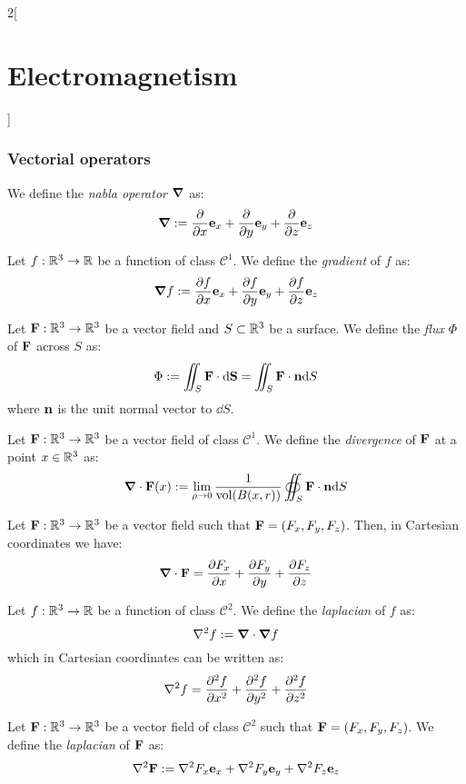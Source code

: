 \documentclass[../../../main.tex]{subfiles}
\begin{document}
\begin{multicols}{2}[\section{Electromagnetism}]
  \subsubsection{Vectorial operators}
  \begin{definition}
    We define the \emph{nabla operator} $\grad$ as: $$\grad:=\pdv{}{x}\boldsymbol{\mathrm{e}}_x+\pdv{}{y}\boldsymbol{\mathrm{e}}_y+\pdv{}{z}\boldsymbol{\mathrm{e}}_z$$
  \end{definition}
  \begin{definition}[Gradient]
    Let $f:\mathbb{R}^3\rightarrow\mathbb{R}$ be a function of class $\mathcal{C}^1$. We define the \emph{gradient} of $f$ as: $$\grad f:=\pdv{f}{x}\boldsymbol{\mathrm{e}}_x+\pdv{f}{y}\boldsymbol{\mathrm{e}}_y+\pdv{f}{z}\boldsymbol{\mathrm{e}}_z$$
  \end{definition}
  \begin{definition}[Flux]
    Let $\boldsymbol{\mathrm{F}}:\mathbb{R}^3\rightarrow\mathbb{R}^3$ be a vector field and $S\subset\mathbb{R}^3$ be a surface. We define the \emph{flux} $\Phi$ of $\boldsymbol{\mathrm{F}}$ across $S$ as:
    $$\Phi:=\iint_S\boldsymbol{\mathrm{F}}\cdot \dd \boldsymbol{\mathrm{S}}=\iint_S\boldsymbol{\mathrm{F}}\cdot\boldsymbol{\mathrm{n}} \dd S$$
    where $\boldsymbol{\mathrm{n}}$ is the unit normal vector to $\dd S$.
  \end{definition}
  \begin{definition}[Divergence]
    Let $\boldsymbol{\mathrm{F}}:\mathbb{R}^3\rightarrow\mathbb{R}^3$ be a vector field of class $\mathcal{C}^1$. We define the \emph{divergence} of $\boldsymbol{\mathrm{F}}$ at a point $x\in\mathbb{R}^3$ as:
    $$\boldsymbol{\mathrm{\nabla}}\cdot \boldsymbol{\mathrm{F}}(x):=\lim_{\rho\to 0}\frac{1}{\text{vol}(B(x,r))}\oiint_{S}\boldsymbol{\mathrm{F}}\cdot\boldsymbol{\mathrm{n}} \dd S$$
  \end{definition}
  \begin{prop}
    Let $\boldsymbol{\mathrm{F}}:\mathbb{R}^3\rightarrow\mathbb{R}^3$ be a vector field such that $\boldsymbol{\mathrm{F}}=(F_x,F_y,F_z)$. Then, in Cartesian coordinates we have: $$\boldsymbol{\mathrm{\nabla}}\cdot \boldsymbol{\mathrm{F}}=\pdv{F_x}{x}+\pdv{F_y}{y}+\pdv{F_z}{z}$$
  \end{prop}
  \begin{definition}[Laplacian]
    Let $f:\mathbb{R}^3\rightarrow\mathbb{R}$ be a function of class $\mathcal{C}^2$. We define the \emph{laplacian} of $f$ as: $$\laplacian f:=\divp\grad f$$
    which in Cartesian coordinates can be written as:
    $$\laplacian f=\pdv[2]{f}{x}+\pdv[2]{f}{y}+\pdv[2]{f}{z}$$
  \end{definition}
  \begin{definition}
    Let $\boldsymbol{\mathrm{F}}:\mathbb{R}^3\rightarrow\mathbb{R}^3$ be a vector field of class $\mathcal{C}^2$ such that $\boldsymbol{\mathrm{F}}=(F_x,F_y,F_z)$. We define the \emph{laplacian} of $\boldsymbol{\mathrm{F}}$ as: $$\laplacian\vf{F}:=\laplacian F_x\vf{e}_x+\laplacian F_y\vf{e}_y+\laplacian F_z\vf{e}_z$$
  \end{definition}

\end{multicols}
\end{document}
